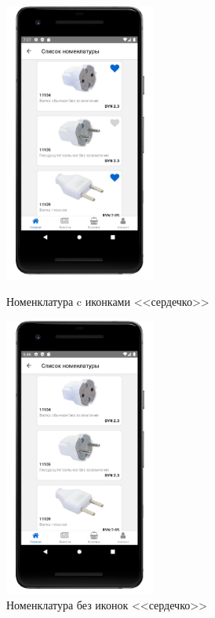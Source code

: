 \begin{figure}[!htb]\centering
    \begin{minipage}{0.49\textwidth}
        \centering

        \includegraphics[height=9.2cm]
        {images/mobile/items/items_with_account.png}

        \caption{Номенклатура c иконками <<сердечко>>}
        \label{fig:test_like_items}
    \end{minipage}
    \begin{minipage}{0.49\textwidth}
        \centering

        \includegraphics[height=9.2cm]
        {images/mobile/items/items.png}

        \caption{Номенклатура без иконок <<сердечко>>}
        \label{fig:test_nolike_items}
    \end{minipage}
\end{figure}

